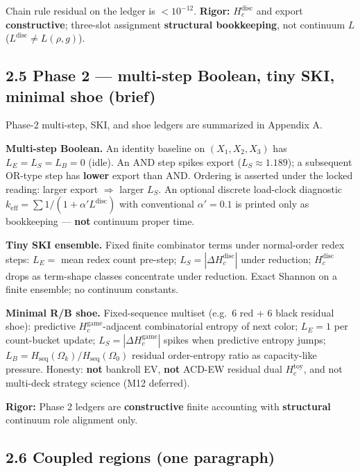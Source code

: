 \documentclass[
  11pt,
]{article}
\begin{document}
Chain rule residual on the ledger is \(<10^{-12}\). \textbf{Rigor:}
\(H_c^{\mathrm{disc}}\) and export \textbf{constructive}; three-slot
assignment \textbf{structural bookkeeping}, not continuum \(L\)
(\(L^{\mathrm{disc}}\neq L(\rho,g)\)).

\subsection{2.5 Phase 2 --- multi-step Boolean, tiny SKI, minimal shoe
(brief)}\label{phase-2-multi-step-boolean-tiny-ski-minimal-shoe-brief}

Phase-2 multi-step, SKI, and shoe ledgers are summarized in Appendix A.

\textbf{Multi-step Boolean.} An identity baseline on \((X_1,X_2,X_3)\)
has \(L_E=L_S=L_B=0\) (idle). An AND step spikes export
(\(L_S\approx 1.189\)); a subsequent OR-type step has \textbf{lower}
export than AND. Ordering is asserted under the locked reading: larger
export \(\Rightarrow\) larger \(L_S\). An optional discrete load-clock
diagnostic \(k_{\mathrm{eff}}=\sum 1/(1+\alpha' L^{\mathrm{disc}})\)
with conventional \(\alpha'=0.1\) is printed only as bookkeeping ---
\textbf{not} continuum proper time.

\textbf{Tiny SKI ensemble.} Fixed finite combinator terms under
normal-order redex steps: \(L_E=\) mean redex count pre-step;
\(L_S=|\Delta H_c^{\mathrm{disc}}|\) under reduction;
\(H_c^{\mathrm{disc}}\) drops as term-shape classes concentrate under
reduction. Exact Shannon on a finite ensemble; no continuum constants.

\textbf{Minimal R/B shoe.} Fixed-sequence multiset (e.g.~6 red + 6 black
residual shoe): predictive \(H_c^{\mathrm{game}}\)-adjacent
combinatorial entropy of next color; \(L_E=1\) per count-bucket update;
\(L_S=|\Delta H_c^{\mathrm{game}}|\) spikes when predictive entropy
jumps; \(L_B=H_{\mathrm{seq}}(\Omega_k)/H_{\mathrm{seq}}(\Omega_0)\)
residual order-entropy ratio as capacity-like pressure. Honesty:
\textbf{not} bankroll EV, \textbf{not} ACD-EW residual dual
\(H_c^{\mathrm{toy}}\), and not multi-deck strategy science (M12
deferred).

\textbf{Rigor:} Phase 2 ledgers are \textbf{constructive} finite
accounting with \textbf{structural} continuum role alignment only.

\subsection{2.6 Coupled regions (one
paragraph)}\label{coupled-regions-one-paragraph}
\end{document}
